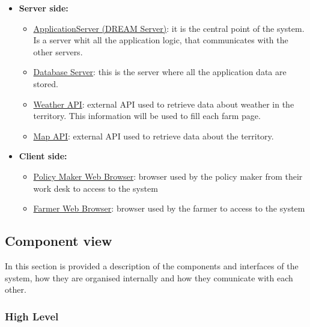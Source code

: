 \begin{itemize}
    \item \textbf{Server side:}
        \begin{itemize}
            \item \underline{ApplicationServer (DREAM Server)}: it is the central point of the system. Is a server whit all the application logic, that communicates with the other servers. 
            \item \underline{Database Server}: this is the server where all the application data are stored.
            \item \underline{Weather API}: external API used to retrieve data about weather in the territory. This information will be used to fill each farm page.
            \item \underline{Map API}: external API used to retrieve data about the territory.
        \end{itemize}
    \item \textbf{Client side:}
        \begin{itemize}
            \item \underline{Policy Maker Web Browser}: browser used by the policy maker from their work desk to access to the system
            \item \underline{Farmer Web Browser}: browser used by the farmer to access to the system
        \end{itemize}
\end{itemize}


\subsection{Component view}

In this section is provided a description of the components and interfaces of the system, how they are organised internally and how they comunicate with each other.

\subsubsection{High Level}

